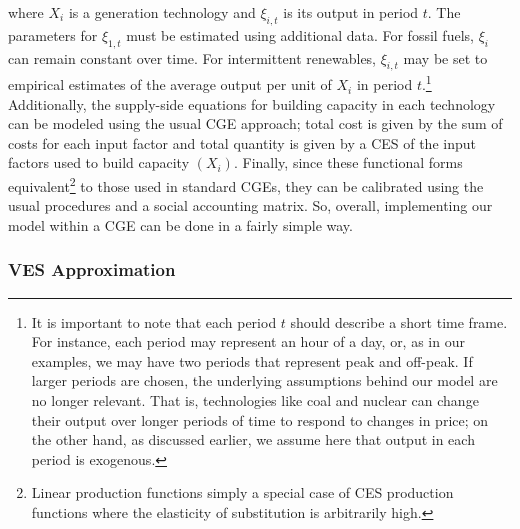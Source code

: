 \documentclass[11pt,a4paper]{extarticle}
\begin{document}
where $X_i$ is a generation technology and $\xi_{i,t}$ is its output in period $t$. The parameters for $\xi_{1,t}$ must be estimated using additional data. For fossil fuels, $\xi_i$ can remain constant over time. For intermittent renewables, $\xi_{i,t}$ may be set to empirical estimates of the average output per unit of $X_i$ in period $t$.\footnote{ It is important to note that each period $t$ should describe a short time frame. For instance, each period may represent an hour of a day, or, as in our examples, we may have two periods that represent peak and off-peak. If larger periods are chosen, the underlying assumptions behind our model are no longer relevant. That is, technologies like coal and nuclear can change their output over longer periods of time to respond to changes in price; on the other hand, as discussed earlier, we assume here that output in each period is exogenous.}  Additionally, the supply-side equations for building capacity in each technology can be modeled using the usual  CGE approach; total cost is given by the sum of costs for each input factor and total quantity is given by a CES of the input factors used to build capacity $(X_i)$. Finally, since these functional forms equivalent\footnote{ Linear production functions simply a special case of CES production functions where the elasticity of substitution is arbitrarily high.} to those used in standard CGEs, they can be calibrated using the usual procedures and a social accounting matrix. So, overall, implementing our model within a CGE can be done in a fairly simple way. 

\subsubsection{VES Approximation}
\end{document}
